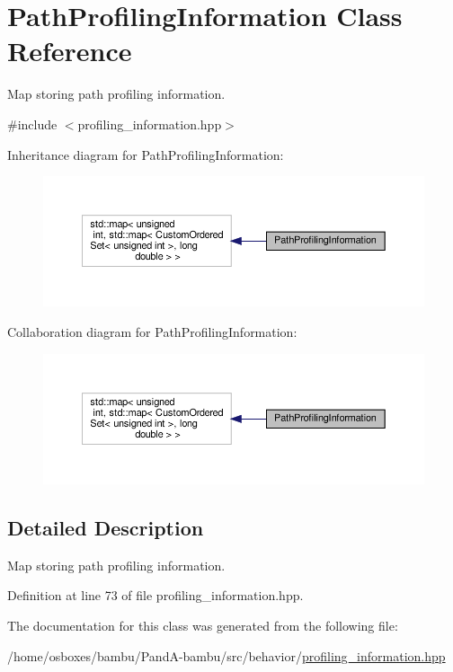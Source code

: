 \hypertarget{classPathProfilingInformation}{}\section{Path\+Profiling\+Information Class Reference}
\label{classPathProfilingInformation}


Map storing path profiling information.  




{\ttfamily \#include $<$profiling\+\_\+information.\+hpp$>$}



Inheritance diagram for Path\+Profiling\+Information\+:
\nopagebreak
\begin{figure}[H]
\begin{center}
\leavevmode
\includegraphics[width=350pt]{d6/d7d/classPathProfilingInformation__inherit__graph}
\end{center}
\end{figure}


Collaboration diagram for Path\+Profiling\+Information\+:
\nopagebreak
\begin{figure}[H]
\begin{center}
\leavevmode
\includegraphics[width=350pt]{de/d8a/classPathProfilingInformation__coll__graph}
\end{center}
\end{figure}


\subsection{Detailed Description}
Map storing path profiling information. 

Definition at line 73 of file profiling\+\_\+information.\+hpp.



The documentation for this class was generated from the following file\+:\begin{DoxyCompactItemize}
\item 
/home/osboxes/bambu/\+Pand\+A-\/bambu/src/behavior/\hyperlink{profiling__information_8hpp}{profiling\+\_\+information.\+hpp}\end{DoxyCompactItemize}
